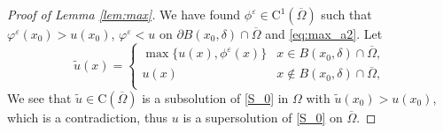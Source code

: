 \documentclass[11pt,reqno]{amsart}
\numberwithin{figure}{section}
\theoremstyle{plain}
\theoremstyle{remark}
\numberwithin{equation}{section}
\newcommand{\rmC}{\mathrm{C}}
\begin{document}
\begin{appendices}
\begin{proof}[Proof of Lemma \ref{lem:max}]
We have found $\phi^\varepsilon\in \mathrm{C}^1(\overline{\Omega})$ such that $\varphi^\varepsilon(x_0)>u(x_0)$, $\varphi^\varepsilon<u$ on $\partial B(x_0,\delta)\cap \overline{\Omega}$ and \eqref{eq:max_a2}. Let
\begin{equation*}
    \tilde{u}(x) = \begin{cases}
    \max \big\lbrace u(x),\phi^\varepsilon(x) \big\rbrace &x\in B(x_0,\delta)\cap \overline{\Omega},\\
    u(x)&x\notin B(x_0,\delta)\cap \overline{\Omega},\\
    \end{cases}
\end{equation*}
We see that $\tilde{u}\in \rmC(\overline{\Omega})$ is a subsolution of \eqref{S_0} in $\Omega$ with $\tilde{u}(x_0) > u(x_0)$, which is a contradiction, thus $u$ is a supersolution of \eqref{S_0} on $\overline{\Omega}$.
\end{proof}

\end{appendices}





{}
%

\end{document}
